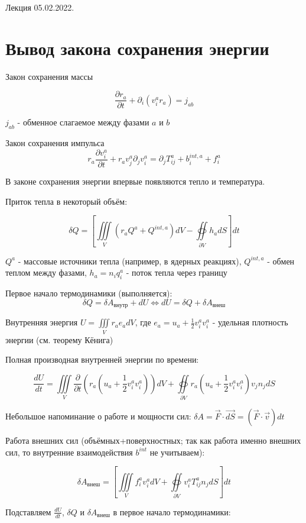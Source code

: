 \documentclass[main.tex]{subfiles}
\begin{document}
Лекция 05.02.2022.

\section{Вывод закона сохранения энергии}

Закон сохранения массы

$$\displaystyle{}\frac{\partial r_{a}}{\partial t}+\partial_i\left(v_i^a r_a\right)=j_{ab}$$

$j_{ab}$ - обменное слагаемое между фазами $a$ и $b$

Закон сохранения импульса
$$\displaystyle{}r_a\frac{\partial v_i^a}{\partial t}+r_a v_j^a\partial_j v_i^a=\partial_j T_{ij}^a+b_i^{int,a}+f_i^a$$


В законе сохранения энергии впервые появляются тепло и температура.

Приток тепла в некоторый объём:

$$\displaystyle{}\delta Q=\left[\iiint\limits_{V}{\left(r_a Q^a+Q^{int,a}\right)}dV-\oiint\limits_{\partial V} h_a dS\right]dt$$

$Q^a$ - массовые источники тепла (например, в ядерных реакциях), $Q^{int, a}$ - обмен теплом между фазами, $h_a=n_iq_i^a$ - поток тепла через границу


Первое начало термодинамики (выполняется): $$\delta Q=\delta A_{\text{внутр}}+dU\Leftrightarrow dU=\delta Q+\delta A_{\text{внеш}}$$

Внутренняя энергия $\displaystyle{}U=\iiint\limits_{V}{r_ae_a}dV$, где $\displaystyle{}e_a=u_a+\frac{1}{2}v_i^av_i^a$ - удельная плотность энергии (см. теорему Кёнига)

Полная производная внутренней энергии по времени:

$$\frac{dU}{dt}=\iiint\limits_{V}{\frac{\partial}{\partial t}\left(r_a\left(u_a+\frac{1}{2}v_i^av_i^a\right)\right)dV}+\oiint\limits_{\partial V}{r_a\left(u_a+\frac{1}{2} v_i^a v_i^a\right)v_j n_j dS}$$

Небольшое напоминание о работе и мощности сил: $\delta A=\vec{F}\cdot\vec{dS}=\left(\vec{F}\cdot\vec{v}\right)dt$

Работа внешних сил (объёмных+поверхностных; так как работа именно внешних сил, то внутренние взаимодействия $b^{int}$ не учитываем):

$$\delta A_{\text{внеш}}=\left[\iiint\limits_{V}{f_i^a v_i^a dV}+\oiint\limits_{\partial V}{v_i^aT_{ij}^an_jdS}\right]dt$$

Подставляем $\frac{dU}{dt}$, $\delta Q$ и $\delta A_{\text{внеш}}$ в первое начало термодинамики:
\end{document}
